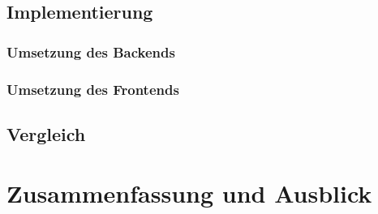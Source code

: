 \section{Implementierung}
\subsection{Umsetzung des Backends}
\subsection{Umsetzung des Frontends}

\section{Vergleich}
\label{realization:comparison}

\chapter{Zusammenfassung und Ausblick}